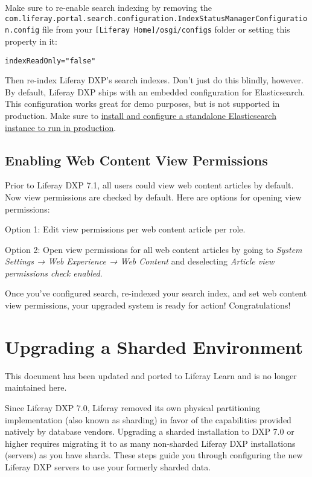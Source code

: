 Make sure to re-enable search indexing by removing the
\texttt{com.liferay.portal.search.configuration.IndexStatusManagerConfiguration.config}
file from your \texttt{{[}Liferay\ Home{]}/osgi/configs} folder or
setting this property in it:

\begin{verbatim}
indexReadOnly="false"
\end{verbatim}

Then re-index Liferay DXP's search indexes. Don't just do this blindly,
however. By default, Liferay DXP ships with an embedded configuration
for Elasticsearch. This configuration works great for demo purposes, but
is not supported in production. Make sure to
\href{/docs/7-2/deploy/-/knowledge_base/d/installing-elasticsearch}{install
and configure a standalone Elasticsearch instance to run in production}.

\section{Enabling Web Content View
Permissions}\label{enabling-web-content-view-permissions}

Prior to Liferay DXP 7.1, all users could view web content articles by
default. Now view permissions are checked by default. Here are options
for opening view permissions:

Option 1: Edit view permissions per web content article per role.

Option 2: Open view permissions for all web content articles by going to
\emph{System Settings → Web Experience → Web Content} and deselecting
\emph{Article view permissions check enabled}.

Once you've configured search, re-indexed your search index, and set web
content view permissions, your upgraded system is ready for action!
Congratulations!

\chapter{Upgrading a Sharded
Environment}\label{upgrading-a-sharded-environment}

{This document has been updated and ported to Liferay Learn and is no
longer maintained here.}

Since Liferay DXP 7.0, Liferay removed its own physical partitioning
implementation (also known as sharding) in favor of the capabilities
provided natively by database vendors. Upgrading a sharded installation
to DXP 7.0 or higher requires migrating it to as many non-sharded
Liferay DXP installations (servers) as you have shards. These steps
guide you through configuring the new Liferay DXP servers to use your
formerly sharded data.

